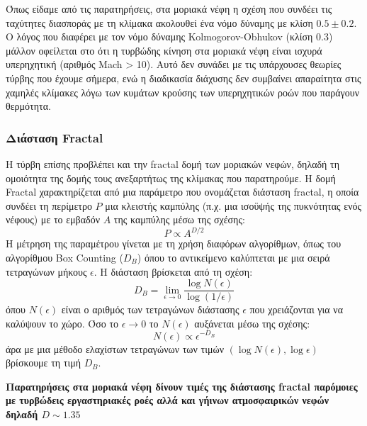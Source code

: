 \documentclass[a4paper,12pt]{memoir}
\begin{document}
Όπως είδαμε από τις παρατηρήσεις, στα μοριακά νέφη η σχέση που συνδέει τις ταχύτητες διασποράς με τη κλίμακα ακολουθεί ένα νόμο δύναμης με κλίση $0.5 \pm 0.2$.  Ο λόγος που διαφέρει με τον νόμο δύναμης Kolmogorov-Obhukov (κλίση $0.3$) μάλλον οφείλεται στο ότι η τυρβώδης κίνηση στα μοριακά νέφη είναι ισχυρά υπερηχητική (αριθμός Mach > 10).
Αυτό δεν συνάδει με τις υπάρχουσες θεωρίες τύρβης που έχουμε σήμερα, ενώ η διαδικασία διάχυσης δεν συμβαίνει απαραίτητα στις χαμηλές κλίμακες λόγω των κυμάτων κρούσης των υπερηχητικών ροών που παράγουν θερμότητα.

\subsubsection{Διάσταση Fractal}
Η τύρβη επίσης προβλέπει και την fractal δομή των μοριακών νεφών, δηλαδή τη ομοιότητα της δομής τους ανεξαρτήτως της κλίμακας που παρατηρούμε. 
Η δομή Fractal χαρακτηρίζεται από μια παράμετρο που ονομάζεται διάσταση fractal, η οποία συνδέει τη περίμετρο $P$ μια κλειστής καμπύλης (π.χ. μια ισοϋψής της πυκνότητας ενός νέφους) με το εμβαδόν $A$ της καμπύλης μέσω της σχέσης:
\begin{equation}
P\propto A^{D/2}
\end{equation}
Η μέτρηση της παραμέτρου γίνεται με τη χρήση διαφόρων αλγορίθμων, όπως του αλγορίθμου Box Counting ($D_B$) όπου το αντικείμενο καλύπτεται με μια σειρά τετραγώνων μήκους $\epsilon$. Η διάσταση βρίσκεται από τη σχέση:
\begin{equation}
D_B = \lim_{\epsilon \to 0} \frac{\log N(\epsilon)}{\log (1/\epsilon)}
\end{equation}
όπου $N(\epsilon)$ είναι ο αριθμός των τετραγώνων διάστασης $\epsilon$ που χρειάζονται για να καλύψουν το χώρο. Όσο το $\epsilon \to  0$ το $N(\epsilon)$ αυξάνεται μέσω της σχέσης:
\begin{equation}
N(\epsilon) \propto \epsilon ^{-D_B}
\end{equation}
άρα με μια μέθοδο ελαχίστων τετραγώνων των τιμών $\left(\log N(\epsilon),\log \epsilon\right)$ βρίσκουμε τη τιμή $D_B$.

\textbf{Παρατηρήσεις στα μοριακά νέφη δίνουν τιμές της διάστασης fractal παρόμοιες με τυρβώδεις εργαστηριακές ροές αλλά και γήινων ατμοσφαιρικών νεφών δηλαδή $D\sim 1.35$}
 
 
\end{document}
